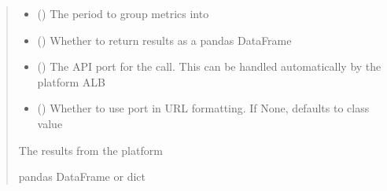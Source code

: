 \documentclass[letterpaper,10pt,english]{sphinxmanual}
\begin{document}
\begin{fulllineitems}
\begin{fulllineitems}
\begin{quote}
\begin{description}
\begin{itemize}
\item {} 
\sphinxAtStartPar
{} (\sphinxstyleliteralemphasis{\sphinxupquote{ (}}\sphinxstyleliteralemphasis{\sphinxupquote{)}}) \textendash{} The period to group metrics into

\item {} 
\sphinxAtStartPar
{} (\sphinxstyleliteralemphasis{\sphinxupquote{ (}}\sphinxstyleliteralemphasis{\sphinxupquote{)}}) \textendash{} Whether to return results as a pandas DataFrame

\item {} 
\sphinxAtStartPar
{} (\sphinxstyleliteralemphasis{\sphinxupquote{ (}}\sphinxstyleliteralemphasis{\sphinxupquote{)}}) \textendash{} The API port for the call. This can be handled automatically by the platform ALB

\item {} 
\sphinxAtStartPar
{} (\sphinxstyleliteralemphasis{\sphinxupquote{ (}}\sphinxstyleliteralemphasis{\sphinxupquote{)}}) \textendash{} Whether to use port in URL formatting. If None, defaults to class value

\end{itemize}

\sphinxAtStartPar
{} \textendash{} The results from the platform

\sphinxAtStartPar
pandas DataFrame or dict

\end{description}\end{quote}

\end{fulllineitems}



\end{fulllineitems}
\end{document}
